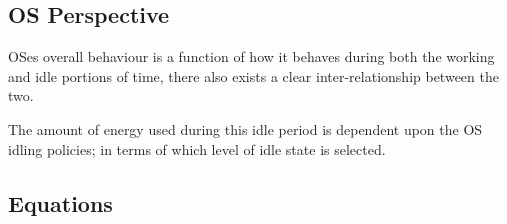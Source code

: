 \subsection{OS Perspective}
OSes overall behaviour is a function of how it behaves during both the working and idle portions of time, there also exists a clear inter-relationship between the two. 

The amount of energy used during this idle period is dependent upon the OS idling policies; in terms of which level of idle state is selected.

\subsection{Equations}

